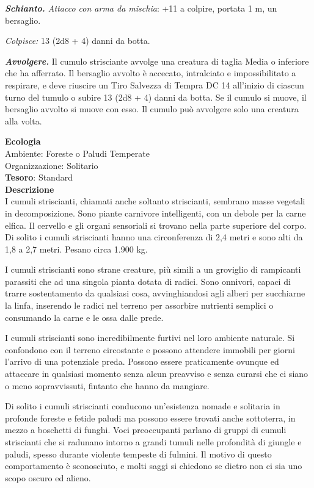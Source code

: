 \begin{multicols}{2}
\textit{\textbf{Schianto.} Attacco con arma da mischia}: +11 a colpire, portata 1 m, un bersaglio.

\textit{Colpisce:} 13 (2d8 + 4) danni da botta.

\textit{\textbf{Avvolgere.}} Il cumulo strisciante avvolge una creatura di taglia Media o inferiore che ha afferrato. Il bersaglio avvolto è accecato, intralciato e impossibilitato a respirare, e deve riuscire un Tiro Salvezza di Tempra DC 14 all'inizio di ciascun turno del tumulo o subire 13 (2d8 + 4) danni da botta. Se il cumulo si muove, il bersaglio avvolto si muove con esso. Il cumulo può avvolgere solo una creatura alla volta.

\textbf{Ecologia}\\
Ambiente: Foreste o Paludi Temperate\\
Organizzazione: Solitario\\
\textbf{Tesoro}: Standard\\
\textbf{Descrizione}\\
I cumuli striscianti, chiamati anche soltanto striscianti, sembrano masse vegetali in decomposizione. Sono piante carnivore intelligenti, con un debole per la carne elfica. Il cervello e gli organi sensoriali si trovano nella parte superiore del corpo. Di solito i cumuli striscianti hanno una circonferenza di 2,4 metri e sono alti da 1,8 a 2,7 metri. Pesano circa 1.900 kg.

I cumuli striscianti sono strane creature, più simili a un groviglio di rampicanti parassiti che ad una singola pianta dotata di radici. Sono onnivori, capaci di trarre sostentamento da qualsiasi cosa, avvinghiandosi agli alberi per succhiarne la linfa, inserendo le radici nel terreno per assorbire nutrienti semplici o consumando la carne e le ossa dalle prede.

I cumuli striscianti sono incredibilmente furtivi nel loro ambiente naturale. Si confondono con il terreno circostante e possono attendere immobili per giorni l'arrivo di una potenziale preda. Possono essere praticamente ovunque ed attaccare in qualsiasi momento senza alcun preavviso e senza curarsi che ci siano o meno sopravvissuti, fintanto che hanno da mangiare.

Di solito i cumuli striscianti conducono un'esistenza nomade e solitaria in profonde foreste e fetide paludi ma possono essere trovati anche sottoterra, in mezzo a boschetti di funghi. Voci preoccupanti parlano di gruppi di cumuli striscianti che si radunano intorno a grandi tumuli nelle profondità di giungle e paludi, spesso durante violente tempeste di fulmini. Il motivo di questo comportamento è sconosciuto, e molti saggi si chiedono se dietro non ci sia uno scopo oscuro ed alieno.


\end{multicols}
